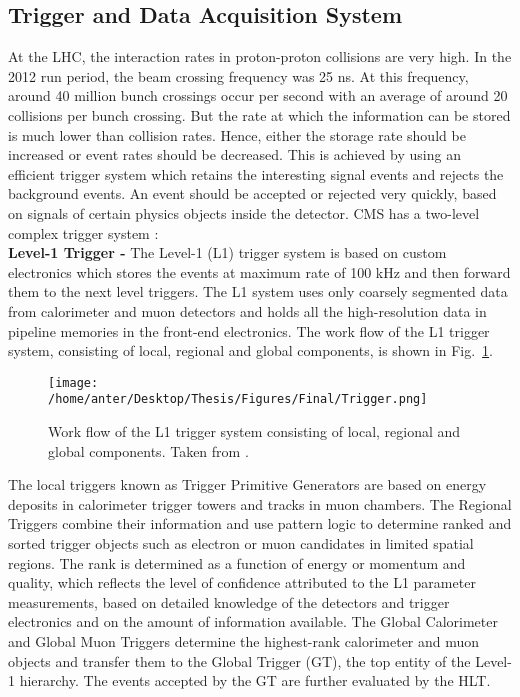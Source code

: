 \subsection{Trigger and Data Acquisition System}
At the LHC, the interaction rates in proton-proton collisions are very high. In the 2012 run period, the beam crossing frequency was 25 ns. At this frequency, around 40 million bunch crossings occur per second with an average of around 20 collisions per bunch crossing. But the rate at which the information can be stored is much lower than collision rates. Hence, either the storage rate should be increased or event rates should be decreased. This is achieved by using an efficient trigger system which retains the interesting signal events and rejects the background events. An event should be accepted or rejected very quickly, based on signals of certain physics objects inside the detector.
CMS has a two-level complex trigger system : \\\newline
{\bf Level-1 Trigger -} The Level-1 (L1) trigger system is based on custom electronics which stores the events at maximum rate of 100 kHz and then forward them to the next level triggers. The L1 system uses only coarsely segmented data from calorimeter and muon detectors and holds all the high-resolution data in pipeline memories in the front-end electronics. The work flow of the L1 trigger system, consisting of local, regional and global components, is shown in Fig.~\ref{fig:L1}.
\begin{figure}[!h]
\begin{center}
\vspace*{3mm} 
\hspace*{-5mm}
\texttt{[image: /home/anter/Desktop/Thesis/Figures/Final/Trigger.png]}\\
\vspace*{4mm}
\caption[Work flow of the L1 trigger system consisting of local, regional and global components.]{Work flow of the L1 trigger system consisting of local, regional and global components. Taken from \cite{Chatrchyan:2008aa}.}
\label{fig:L1}
\end{center}
\end{figure}
The local triggers known as Trigger Primitive Generators are based on energy deposits in calorimeter trigger towers and tracks in muon chambers. The Regional Triggers combine their information and use pattern logic to determine ranked and sorted trigger objects such as electron or muon candidates in limited spatial regions. The rank is determined as a function of energy or momentum and quality, which reflects the level of confidence attributed to the L1 parameter measurements, based on detailed knowledge of the detectors and trigger electronics and on the amount of information available. The Global Calorimeter and Global Muon Triggers determine the highest-rank calorimeter and muon objects and transfer them to the Global Trigger (GT), the top entity of the Level-1 hierarchy. The events accepted by the GT are further evaluated by the HLT. \\\newline
